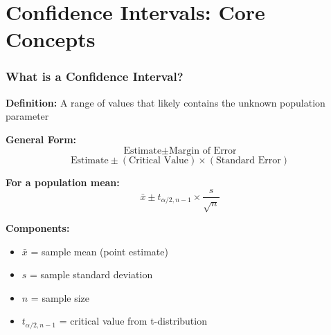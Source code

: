 \documentclass{beamer}
\begin{document}
\section{Confidence Intervals: Core Concepts}

\begin{frame}
\frametitle{What is a Confidence Interval?}
\textbf{Definition:} A range of values that likely contains the unknown population parameter

\vspace{0.5cm}
\textbf{General Form:}
$$\text{Estimate} \pm \text{Margin of Error}$$
$$\text{Estimate} \pm (\text{Critical Value}) \times (\text{Standard Error})$$

\vspace{0.5cm}
\textbf{For a population mean:}
$$\bar{x} \pm t_{\alpha/2, n-1} \times \frac{s}{\sqrt{n}}$$

\vspace{0.5cm}
\textbf{Components:}
\begin{itemize}
\item $\bar{x}$ = sample mean (point estimate)
\item $s$ = sample standard deviation
\item $n$ = sample size
\item $t_{\alpha/2, n-1}$ = critical value from t-distribution
\end{itemize}
\end{frame}
\end{document}
